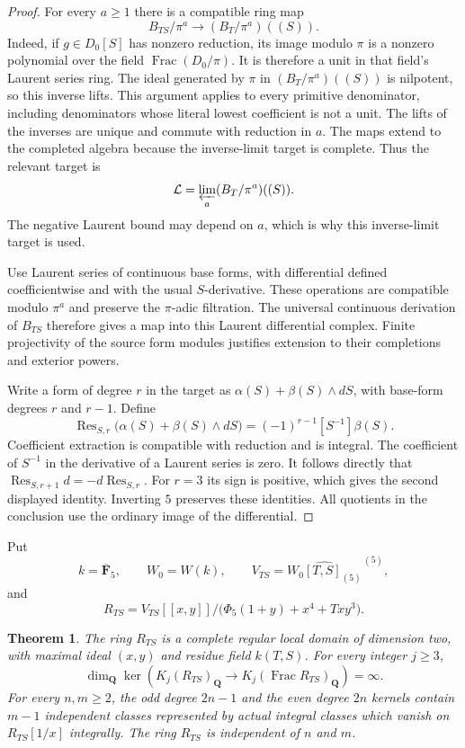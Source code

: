 \documentclass[11pt,a4paper]{amsart}
\numberwithin{equation}{section}
\newtheorem{theorem}{Theorem}[section]
\theoremstyle{definition}
\theoremstyle{remark}
\begin{document}
\begin{proof}
For every $a\geq1$ there is a compatible ring map
\[
 B_{TS}/\pi^a
       \longrightarrow (B_T/\pi^a)((S)).
\]
Indeed, if $g\in D_0[S]$ has nonzero reduction, its image modulo
$\pi$ is a nonzero polynomial over the field
$\operatorname{Frac}(D_0/\pi)$.  It is therefore a unit in that
field's Laurent series ring.  The ideal generated by $\pi$ in
$(B_T/\pi^a)((S))$ is nilpotent, so this inverse lifts.  This
argument applies to every primitive denominator, including
denominators whose literal lowest coefficient is not a unit.
The lifts of the inverses are unique and commute with reduction
in $a$.  The maps extend to the completed algebra because the
inverse-limit target is complete.  Thus the relevant target is
\[
 \mathcal L=\varprojlim_a(B_T/\pi^a)((S)).
\]
The negative Laurent bound may depend on $a$, which is why this
inverse-limit target is used.

Use Laurent series of continuous base forms, with differential
defined coefficientwise and with the usual $S$-derivative.
These operations are compatible modulo $\pi^a$ and preserve
the $\pi$-adic filtration.  The universal continuous derivation
of $B_{TS}$ therefore gives a map into this Laurent differential
complex.  Finite projectivity of the source form modules
justifies extension to their completions and exterior powers.

Write a form of degree $r$ in the target as
$\alpha(S)+\beta(S)\wedge dS$, with base-form degrees $r$
and $r-1$.  Define
\[
 \operatorname{Res}_{S,r}
       \bigl(\alpha(S)+\beta(S)\wedge dS\bigr)
      =(-1)^{r-1}[S^{-1}]\beta(S).
\]
Coefficient extraction is compatible with reduction and is
integral.  The coefficient of $S^{-1}$ in the derivative of a
Laurent series is zero.  It follows directly that
$\operatorname{Res}_{S,r+1}d=-d\operatorname{Res}_{S,r}$.
For $r=3$ its sign is positive, which gives the second displayed
identity.  Inverting $5$ preserves these identities.  All
quotients in the conclusion use the ordinary image of the
differential.
\end{proof}

Put
\[
 k=\overline{\mathbf F}_5,\qquad W_0=W(k),\qquad
 V_{TS}=\widehat{W_0[T,S]_{(5)}}^{\,(5)},
\]
and
\[
 R_{TS}=V_{TS}[[x,y]]/
       \bigl(\Phi_5(1+y)+x^4+Txy^3\bigr).
\]

\begin{theorem}
\label{d2ext:dimtwoCompleteAllDegreesInfiniteRank}
The ring $R_{TS}$ is a complete regular local domain of dimension
two, with maximal ideal $(x,y)$ and residue field $k(T,S)$.
For every integer $j\geq3$,
\[
 \dim_{\mathbf Q}\ker\!\left(
 K_j(R_{TS})_{\mathbf Q}\longrightarrow
 K_j(\operatorname{Frac}R_{TS})_{\mathbf Q}\right)=\infty.
\]
For every $n,m\geq2$, the odd degree $2n-1$ and the even degree
$2n$ kernels contain $m-1$ independent classes represented by
actual integral classes which vanish on $R_{TS}[1/x]$ integrally.
The ring $R_{TS}$ is independent of $n$ and $m$.
\end{theorem}
\end{document}

